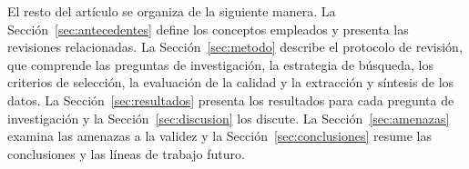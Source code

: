 El resto del artículo se organiza de la siguiente manera. La Sección~\ref{sec:antecedentes} define los conceptos empleados y presenta las revisiones relacionadas. La Sección~\ref{sec:metodo} describe el protocolo de revisión, que comprende las preguntas de investigación, la estrategia de búsqueda, los criterios de selección, la evaluación de la calidad y la extracción y síntesis de los datos. La Sección~\ref{sec:resultados} presenta los resultados para cada pregunta de investigación y la Sección~\ref{sec:discusion} los discute. La Sección~\ref{sec:amenazas} examina las amenazas a la validez y la Sección~\ref{sec:conclusiones} resume las conclusiones y las líneas de trabajo futuro.
